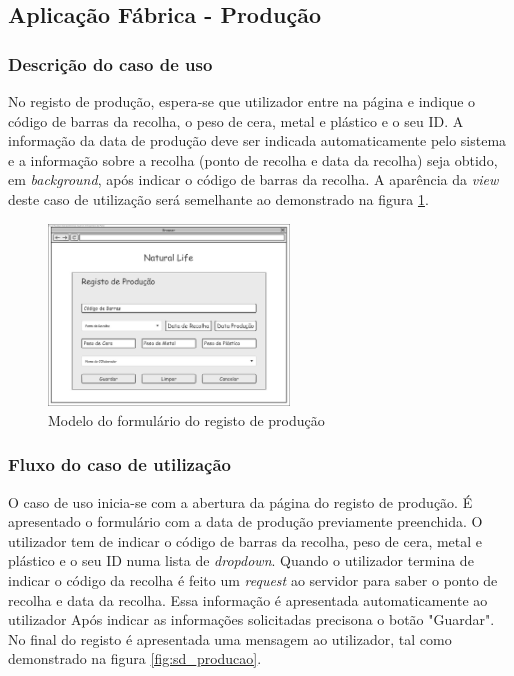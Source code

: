 \subsection{Aplicação Fábrica - Produção}
\subsubsection*{Descrição do caso de uso}
No registo de produção, espera-se que utilizador entre na página e indique o código de barras da recolha, o peso de cera, metal e plástico e o seu ID. A informação da data de produção deve ser indicada automaticamente pelo sistema e a informação sobre a recolha (ponto de recolha e data da recolha) seja obtido, em \textit{background}, após indicar o código de barras da recolha. A aparência da \textit{view} deste caso de utilização será semelhante ao demonstrado na figura \ref{fig:di_producao}.

\begin{figure}[H] 
	\begin{center}
		\includegraphics[width=0.57\textwidth,keepaspectratio]{figuras/Diagramas_vp/DI_Fabrica_3_Registo_de_Producao.jpg}
		\caption{Modelo do formulário do registo de produção}
		\label{fig:di_producao} 
	\end{center}
\end{figure}


\subsubsection*{Fluxo do caso de utilização}
O caso de uso inicia-se com a abertura da página do registo de produção. É apresentado o formulário com a data de produção previamente preenchida. O utilizador tem de indicar o código de barras da recolha, peso de cera, metal e plástico e o seu ID numa lista de \textit{dropdown}. Quando o utilizador termina de indicar o código da recolha é feito um \textit{request} ao servidor para saber o ponto de recolha e data da recolha. Essa informação é apresentada automaticamente ao utilizador Após indicar as informações solicitadas precisona o botão "Guardar". No final do registo é apresentada uma mensagem ao utilizador, tal como demonstrado na figura \ref{fig:sd_producao}.

